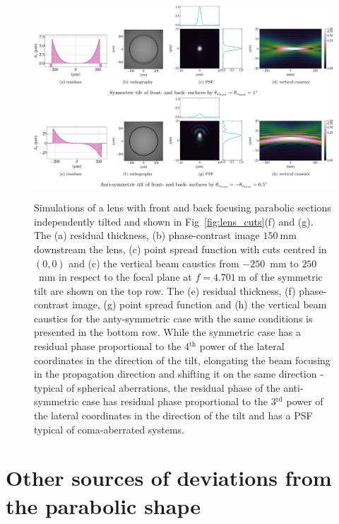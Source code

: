 \begin{refsection}
\begin{figure}[t]
        \centering
        {\includegraphics[width=1.\linewidth]{figures/ch04/tilt_fs_CRL.pdf}}
        \caption[Effects of the tilted parabolic section]{Simulations of a lens with front and back focusing parabolic sections independently tilted and shown in Fig~\ref{fig:lens_cuts}(f) and (g). The (a) residual thickness, (b) phase-contrast image $150~$mm downstream the lens, (c) point spread function with cuts centred in $(0,0)$ and (c) the vertical beam caustics from $-250$~mm to $250$~mm in respect to the focal plane at $f=4.701~$m of the symmetric tilt are shown on the top row. The (e) residual thickness, (f) phase-contrast image, (g) point spread function and (h) the vertical beam caustics for the anty-symmetric case with the same conditions is presented in the bottom row. While the symmetric case has a residual phase proportional to the 4$^{\text{th}}$ power of the lateral coordinates in the direction of the tilt, elongating the beam focusing in the propagation direction and shifting it on the same direction - typical of spherical aberrations, the residual phase of the anti-symmetric case has residual phase proportional to the 3$^{\text{rd}}$ power of the lateral coordinates in the direction of the tilt and has a PSF typical of coma-aberrated systems.  } \label{fig:tilt_fs_CRL}
\end{figure}

\section{Other sources of deviations from the parabolic shape}\label{sec:other_sources}


\end{refsection}
